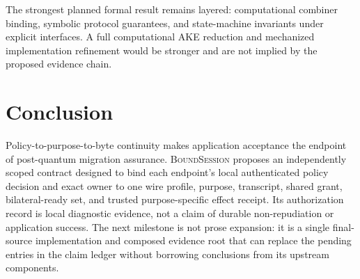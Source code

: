 \documentclass[journal]{IEEEtran}
\newcommand{\system}{\textsc{BoundSession}}
\begin{document}
The strongest planned formal result remains layered: computational combiner
binding, symbolic protocol guarantees, and state-machine invariants under
explicit interfaces. A full computational AKE reduction and mechanized
implementation refinement would be stronger and are not implied by the proposed
evidence chain.

\section{Conclusion}

Policy-to-purpose-to-byte continuity makes application acceptance the endpoint
of post-quantum migration assurance. \system{} proposes an independently scoped
contract designed to bind each endpoint's local authenticated policy decision
and exact owner to one wire profile, purpose, transcript, shared grant,
bilateral-ready set, and trusted purpose-specific effect receipt. Its
authorization record is local diagnostic
evidence, not a claim of durable non-repudiation or application success. The next
milestone is not prose expansion: it is a
single final-source implementation and composed evidence root that can replace
the pending entries in the claim ledger without borrowing conclusions from its
upstream components.



\end{document}
